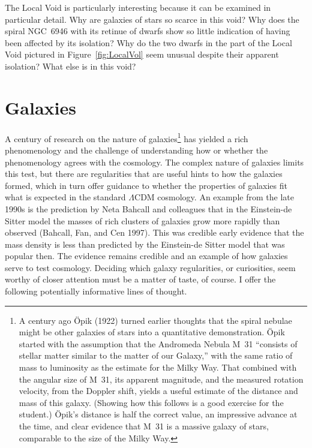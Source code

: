 \documentclass[fleqn,12pt]{article}
\begin{document}
The Local Void is particularly interesting because it can be examined in particular detail. Why are galaxies of stars so scarce in this void? Why does the spiral NGC~6946 with its retinue of dwarfs show so little indication of having been affected by its isolation? Why do the two dwarfs in the part of the Local Void pictured in Figure~\ref{fig:LocalVol} seem unusual despite their apparent isolation? What else is in this void?

\section{Galaxies}\label{sec:galaxies} 

A century of research on the nature of galaxies\footnote{A century ago \"Opik (1922) turned earlier thoughts that the spiral nebulae might be other galaxies of stars into a quantitative demonstration. \"Opik started with the assumption that the Andromeda Nebula M~31 ``consists of stellar matter similar to the matter of our Galaxy,'' with the same ratio of mass to luminosity as the estimate for the Milky Way. That combined with the angular size of M~31, its apparent magnitude, and the measured rotation velocity, from the Doppler shift, yields a useful estimate of the distance and mass of this galaxy. (Showing how this follows is a good exercise for the student.)  \"Opik's distance is half the correct value, an impressive advance at the time, and clear evidence that M~31 is a massive galaxy of stars, comparable to the size of the Milky Way.} has yielded a rich phenomenology and the challenge of understanding how or whether the phenomenology agrees with the cosmology. The complex nature of galaxies limits this test, but there are regularities that are useful hints to how the galaxies formed, which in turn offer guidance to whether the properties of galaxies fit what is expected in the standard $\Lambda$CDM cosmology. An example from the late 1990s is the prediction by Neta Bahcall and colleagues that in the Einstein-de Sitter model the masses of rich clusters of galaxies grow more rapidly than observed (Bahcall, Fan, and Cen 1997). This was credible early evidence that the mass density is less than predicted by the Einstein-de Sitter model that was popular then. The evidence remains credible and an example of how galaxies serve to test cosmology. Deciding which galaxy regularities, or curiosities, seem  worthy of closer attention must be a matter of taste, of course. I offer the following potentially informative lines of thought. 
\end{document}
